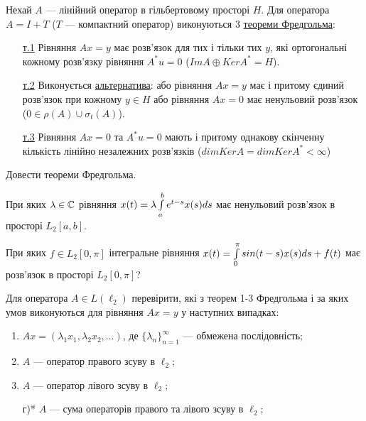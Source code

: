 
\begin{theory}
    Нехай $A$ --- лінійний оператор в гільбертовому просторі $H$. 
    Для оператора $A = I + T$ ($T$ --- компактний оператор) виконуються 
    3 \ul{теореми Фредгольма}:
    \begin{enumerate}
        \item[\ul{т.1}] Рівняння $Ax = y$ має розв'язок для тих і 
        тільки тих $y$, які ортогональні кожному розв'язку рівняння 
        $A^*u = 0$ ($Im A \oplus Ker A^* = H$).
        \item[\ul{т.2}] Виконується \ul{альтернатива}: або рівняння $Ax = y$ 
        має і притому єдиний розв'язок при кожному $y \in H$ або рівняння 
        $Ax = 0$ має ненульовий розв'язок ($0 \in \rho(A) \cup \sigma_t(A)$).
        \item[\ul{т.3}] Рівняння $Ax = 0$ та $A^* u = 0$ мають і притому 
        однакову скінченну кількість лінійно незалежних розв'язків 
        ($dim Ker A = dim Ker A^* < \infty$)
    \end{enumerate}
\end{theory}

\begin{exercise}
    Довести теореми Фредгольма.
\end{exercise}

\begin{exercise}
    При яких $\lambda \in \mathbb{C}$ рівняння $x(t) = \lambda 
    \int\limits_{a}^{b}e^{t-s}x(s)ds$ має ненульовий розв'язок в просторі 
    $L_2[a, b]$.
\end{exercise}

\begin{exercise}
    При яких $f \in L_2 [0, \pi]$ інтегральне рівняння $x(t) = 
    \int\limits_{0}^{\pi} sin(t-s)x(s)ds + f(t)$ має розв'язок в просторі 
    $L_2[0, \pi]$?
\end{exercise}

\begin{exercise}
    Для оператора $A \in L(\ell_2)$ перевірити, які з теорем 1-3 
    Фредгольма і за яких умов виконуються для рівняння $Ax = y$ у 
    наступних випадках:
    \begin{enumerate}
        \item $Ax = (\lambda_1 x_1, \lambda_2 x_2, ...)$, де 
        $\{\lambda_n\}_{n=1}^\infty$ --- обмежена послідовність;
        \item $A$ --- оператор правого зсуву в $\ell_2$;
        \item $A$ --- оператор лівого зсуву в $\ell_2$;
        \item[г)*] $A$ --- сума операторів правого та лівого 
        зсуву в $\ell_2$;
    \end{enumerate}
\end{exercise}


